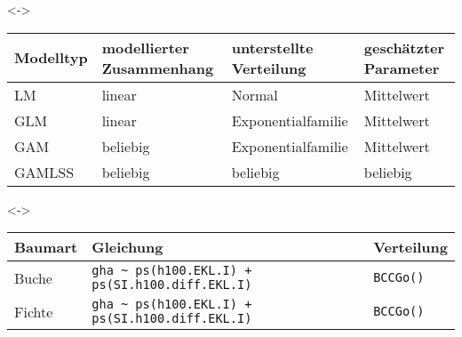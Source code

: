 \begin{frame}[c]
  \visible<\theFirstElement->{
    \begin{center}
      \begin{minipage}[t]{0.975\linewidth}
        {\scriptsize
          \begin{tabular}{l l l l}
            \toprule
            Modelltyp & modellierter Zusammenhang & unterstellte Verteilung & geschätzter Parameter \\
            \midrule
            LM & linear & Normal & Mittelwert \\
            GLM & linear & Exponentialfamilie & Mittelwert \\
            GAM & beliebig & Exponentialfamilie & Mittelwert \\
            GAMLSS & beliebig & beliebig & beliebig \\
            \bottomrule
          \end{tabular}}
      \end{minipage}
    \end{center}}

  \visible<\theSecondElement->{
    \begin{center}
      \begin{minipage}[t]{0.825\linewidth}
        {\scriptsize
          \begin{tabular}{l l l}
            \toprule
            Baumart & Gleichung & Verteilung \\
            \midrule
            Buche & \texttt{gha \textasciitilde{} ps(h100.EKL.I) + ps(SI.h100.diff.EKL.I)} & \texttt{BCCGo()} \\
            Fichte & \texttt{gha \textasciitilde{} ps(h100.EKL.I) + ps(SI.h100.diff.EKL.I)} & \texttt{BCCGo()} \\
            \bottomrule
          \end{tabular}}
      \end{minipage}
    \end{center}}
  

\end{frame}
